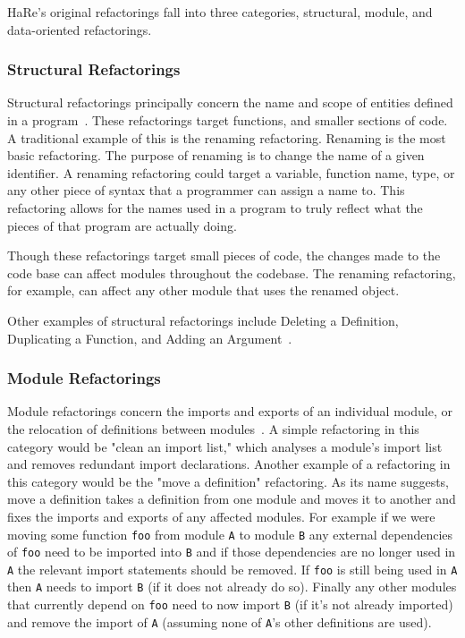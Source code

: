 HaRe's original refactorings fall into three categories, structural, module, and data-oriented refactorings.

\subsubsection{Structural Refactorings}

Structural refactorings principally concern the name and scope of entities defined in a program~\citep{huiqingThesis}. These refactorings target functions, and smaller sections of code.  A traditional example of this is the renaming refactoring. Renaming is the most basic refactoring. The purpose of renaming is to change the name of a given identifier. A renaming refactoring could target a variable, function name, type, or any other piece of syntax that a programmer can assign a name to. This refactoring allows for the names used in a program to truly reflect what the pieces of that program are actually doing. 

Though these refactorings target small pieces of code, the changes made to the code base can affect modules throughout the codebase. The renaming refactoring, for example, can affect any other module that uses the renamed object.

Other examples of structural refactorings include Deleting a Definition, Duplicating a Function, and Adding an Argument~\citep{huiqingThesis}.

\subsubsection{Module Refactorings}

Module refactorings concern the imports and exports of an individual module, or the relocation of definitions between modules~\citep{huiqingThesis}. A simple refactoring in this category would be "clean an import list," which analyses a module's import list and removes redundant import declarations. Another example of a refactoring in this category would be the "move a definition" refactoring. As its name suggests, move a definition takes a definition from one module and moves it to another and fixes the imports and exports of any affected modules. For example if we were moving some function \texttt{foo} from module \texttt{A} to module \texttt{B} any external dependencies of \texttt{foo} need to be imported into \texttt{B} and if those dependencies are no longer used in \texttt{A} the relevant import statements should be removed. If \texttt{foo} is still being used in \texttt{A} then \texttt{A} needs to import \texttt{B} (if it does not already do so). Finally any other modules that currently depend on \texttt{foo} need to now import \texttt{B} (if it's not already imported) and remove the import of \texttt{A} (assuming none of \texttt{A}'s other definitions are used).

